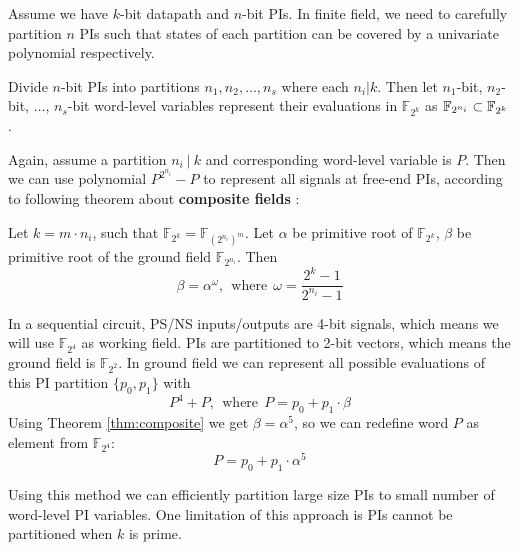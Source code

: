 \begin{figure}[hbt]
\end{figure}

Assume we have $k$-bit datapath and $n$-bit PIs. In finite field, we need to carefully partition $n$ PIs
such that states of each partition can be covered by a univariate polynomial respectively.

\begin{Proposition}
Divide $n$-bit PIs into partitions $n_1,n_2,\dots, n_s$ where each $n_i|k$. Then let $n_1$-bit, $n_2$-bit, $\dots$, $n_s$-bit word-level variables
represent their evaluations in $\mathbb F_{2^k}$ as ${\mathbb{F}}_{2^{n_i}} \subset {\mathbb{F}}_{2^k}$.
\end{Proposition}

Again, assume a partition $n_i~|~k$ and corresponding word-level variable is $P$. Then we can use polynomial
$P^{2^{n_i}}-P$ to represent all signals at free-end PIs, according to following theorem about {\bf composite
fields} \cite{ecc:software}:
\begin{Theorem}
\label{thm:composite}
Let $k = m\cdot n_i$, such that $\mathbb F_{2^k} = \mathbb F_{(2^{n_i})^m}$. Let $\alpha$ be primitive root of 
$\mathbb F_{2^k}$, $\beta$ be primitive root of the ground field $\mathbb F_{2^{n_i}}$. Then
$$\beta = \alpha^\omega,~~\text{where}~~\omega = \frac{2^k-1}{2^{n_i}-1}$$
\end{Theorem}
\begin{Example}
\label{ex:PI}
In a sequential circuit, PS/NS inputs/outputs are 4-bit signals, which means we will use $\mathbb F_{2^4}$
as working field. PIs are partitioned to 2-bit vectors, which means the ground field is $\mathbb F_{2^2}$.
In ground field we can represent all possible evaluations of this PI partition $\{p_0,p_1\}$ with
$$P^4+P,~~\text{where}~~P=p_0+p_1\cdot\beta$$
Using Theorem \ref{thm:composite} we get $\beta = \alpha^5$, so we can redefine word $P$ as element from $\mathbb F_{2^4}$:
$$P = p_0 + p_1\cdot\alpha^5$$
\end{Example}
Using this method we can efficiently partition large size PIs to small number of word-level PI variables.
One limitation of this approach is PIs cannot be partitioned when $k$ is prime.

